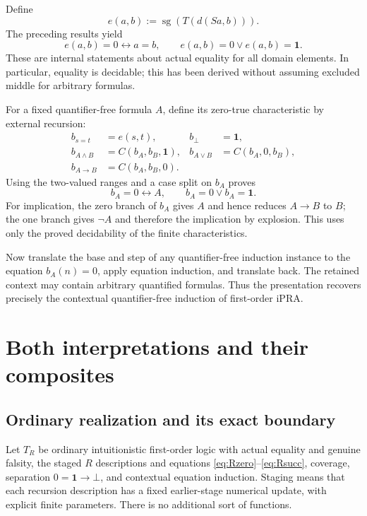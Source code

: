 \documentclass[11pt,letterpaper]{article}
\theoremstyle{definition}\newtheorem{definition}[theorem]{Definition}
\theoremstyle{remark}\newtheorem{remark}[theorem]{Remark}
\newcommand{\one}{\mathbf1}
\begin{document}
Define
\[
 e(a,b):=\operatorname{sg}(T(d(Sa,b))).
\]
The preceding results yield
\begin{equation}\label{eq:eqtest}
 e(a,b)=0\leftrightarrow a=b,
 \qquad e(a,b)=0\lor e(a,b)=\one.
\end{equation}
These are internal statements about actual equality for all
domain elements. In particular, equality is decidable; this
has been derived without assuming excluded middle for arbitrary
formulas.

For a fixed quantifier-free formula $A$, define its zero-true
characteristic by external recursion:
\begin{align*}
 b_{s=t}&=e(s,t),&b_\bot&=\one,\\
 b_{A\land B}&=C(b_A,b_B,\one),&
 b_{A\lor B}&=C(b_A,0,b_B),\\
 b_{A\to B}&=C(b_A,b_B,0).
\end{align*}
Using the two-valued ranges and a case split on $b_A$ proves
\[
             b_A=0\leftrightarrow A,
             \qquad b_A=0\lor b_A=\one.
\]
For implication, the zero branch of $b_A$ gives $A$ and hence
reduces $A\to B$ to $B$; the one branch gives $\neg A$ and
therefore the implication by explosion. This uses only the
proved decidability of the finite characteristics.

Now translate the base and step of any quantifier-free induction
instance to the equation $b_A(n)=0$, apply equation induction,
and translate back. The retained context may contain arbitrary
quantified formulas. Thus the presentation recovers precisely
the contextual quantifier-free induction of first-order iPRA.

\section{Both interpretations and their composites}\label{sec:biinterp}

\subsection{Ordinary realization and its exact boundary}
Let $T_R$ be ordinary intuitionistic first-order logic with actual
equality and genuine falsity, the staged $R$ descriptions and
equations \eqref{eq:Rzero}--\eqref{eq:Rsucc}, coverage,
separation $0=\one\to\bot$, and contextual equation induction.
Staging means that each recursion description has a fixed
earlier-stage numerical update, with explicit finite parameters.
There is no additional sort of functions.
\end{document}
